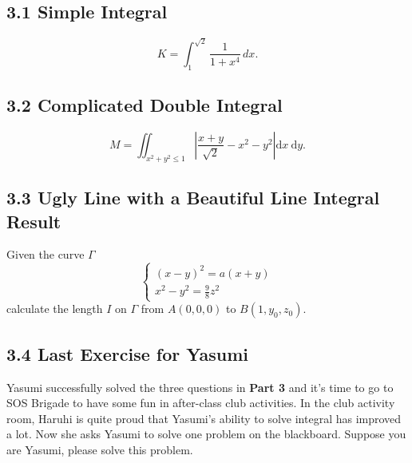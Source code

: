\documentclass[12pt]{article}
\begin{document}
\subsection*{3.1 Simple Integral}
\begin{equation*}
    K = \int^{\sqrt{2}}_{1} \frac{1}{1 + x^4}\,dx. 
\end{equation*}

\subsection*{3.2 Complicated Double Integral}
\begin{equation*}
    M=\iint_{x^{2}+y^{2} \leqslant 1}\left|\frac{x+y}{\sqrt{2}}-x^{2}-y^{2}\right| \mathrm{d} x \mathrm{~d} y.
\end{equation*}

\subsection*{3.3 Ugly Line with a Beautiful Line Integral Result}
Given the curve $\Gamma$
\begin{equation*}
    \left\{\begin{array}{l}
(x-y)^{2}=a(x+y) \\
x^{2}-y^{2}=\frac{9}{8} z^{2}
\end{array}\right.
\end{equation*}
calculate the length $I$ on $\Gamma$ from $A\left(0, 0, 0\right)$ to $B\left(1, y_0, z_0\right)$. 

\subsection*{3.4 Last Exercise for Yasumi}
\par Yasumi successfully solved the three questions in \textbf{Part 3} and it's time to go to SOS Brigade to have some fun in after-class club activities. In the club activity room, Haruhi is quite proud that Yasumi's ability to solve integral has improved a lot. Now she asks Yasumi to solve one problem on the blackboard. Suppose you are Yasumi, please solve this problem.
\end{document}
